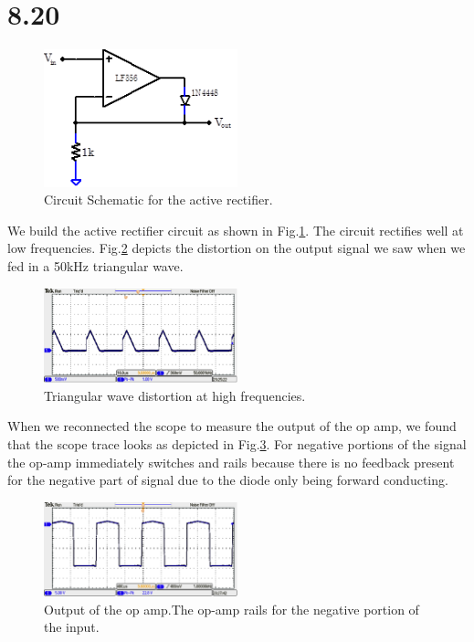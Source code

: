 \documentclass[authoryear, 12pt,5p, times]{elsarticle}
\begin{document}
\section*{8.20}
 \begin{figure}[h!]
 \centering
  \includegraphics[width=0.5\textwidth]{figure/8_20_schema.png} 
\caption{Circuit Schematic for the active rectifier.}
\label{8_20_schema}
 \end{figure}
 We build the active rectifier circuit as shown in Fig.\ref{8_20_schema}. The circuit rectifies well at low frequencies. Fig.\ref{tri} depicts the distortion on the output signal we saw when we fed in a 50kHz triangular wave.   
 \begin{figure}[h!]
 \centering
  \includegraphics[width=0.5\textwidth]{figure/tri.png} 
\caption{Triangular wave distortion at high frequencies.}
\label{tri}
 \end{figure}
 \par When we reconnected the scope to measure the output of the op amp, we found that the scope trace looks as depicted in Fig.\ref{la}. For negative portions of the signal the op-amp immediately switches and rails because there is no feedback present for the negative part of signal due to the diode only being forward conducting.
 \begin{figure}[h!]
 \centering
  \includegraphics[width=0.5\textwidth]{figure/la.png} 
\caption{Output of the op amp.The op-amp rails for the negative portion of the input. }
\label{la}
 \end{figure}
\end{document}
